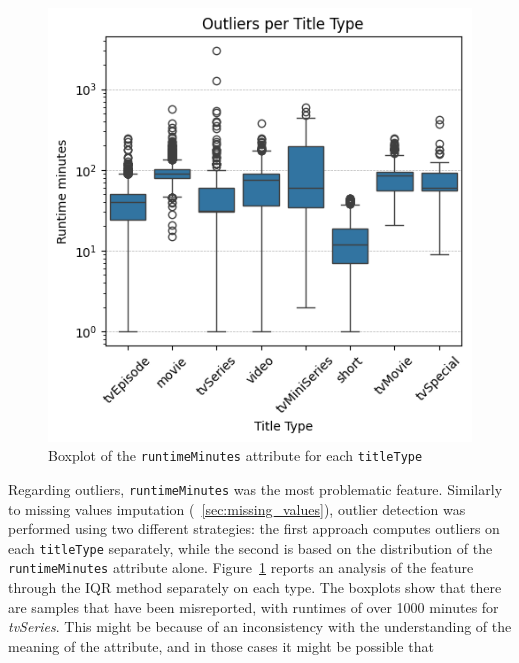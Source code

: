 \begin{figure}
    \centering
    \includegraphics[width=1\linewidth]{plots/outliers.png}
    \captionsetup{width=0.9\linewidth, justification=raggedleft}
    \caption{Boxplot of the \texttt{runtimeMinutes} attribute for each \texttt{titleType}}
    \label{fig:outliers}
\end{figure}
Regarding outliers, \texttt{runtimeMinutes} was the most problematic feature.
Similarly to missing values imputation (~\ref{sec:missing_values}),
outlier detection was performed using two different strategies:
the first approach computes outliers on each \texttt{titleType} separately,
while the second is based on the distribution of the \texttt{runtimeMinutes} attribute alone.
Figure~\ref{fig:outliers} reports an analysis of the feature through the IQR method separately on each type.
The boxplots show that there are samples that have been misreported, with runtimes of over 1000 minutes for \textit{tvSeries}.
This might be because of an inconsistency with the understanding of the meaning of the attribute, and in those cases it might be possible that

